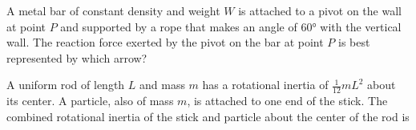 \documentclass{../../../oss-ap12ibhl}
\begin{document}
\begin{questions}
  \vspace{.1in}
  \begin{minipage}{.5\linewidth}
  \end{minipage}
  \begin{minipage}{.2\linewidth}
  \end{minipage}
  
  \question A metal bar of constant density and weight $W$ is attached to a
  pivot on the wall at point $P$ and supported by a rope that makes an angle of
  \ang{60} with the vertical wall. The reaction force exerted by the pivot on
  the bar at point $P$ is best represented by which arrow?

  \begin{minipage}{.3\linewidth}
  \end{minipage}
  \begin{minipage}{.3\linewidth}
    \begin{choices}
      \choice{\Huge $\nearrow$}
      \choice{\Huge $\uparrow$}
      \choice{\Huge $\downarrow$}
      \choice{\Huge $\nwarrow$}
      \choice{\Huge $\searrow$}
    \end{choices}
  \end{minipage}
  \newpage
  
  \question A uniform rod of length $L$ and mass $m$ has a rotational inertia of
  $\displaystyle \frac1{12}mL^2$ about its center. A particle, also of mass
  $m$, is attached to one end of the stick. The combined rotational inertia of
  the stick and particle about the center of the rod is


\end{questions}
\end{document}
